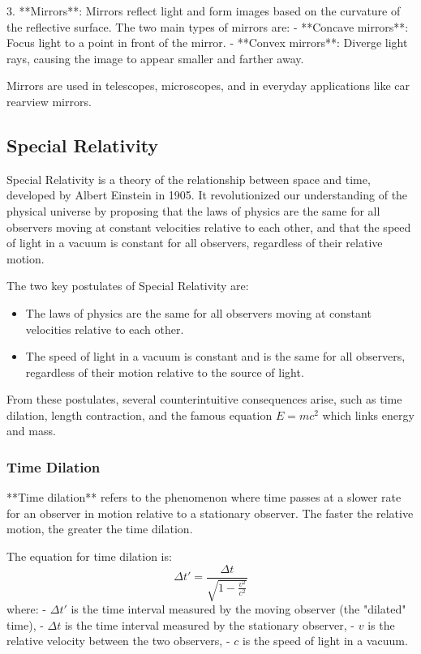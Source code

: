 \documentclass{article}
\begin{document}
3. **Mirrors**: Mirrors reflect light and form images based on the curvature of the reflective surface. The two main types of mirrors are:
   - **Concave mirrors**: Focus light to a point in front of the mirror.
   - **Convex mirrors**: Diverge light rays, causing the image to appear smaller and farther away.

   Mirrors are used in telescopes, microscopes, and in everyday applications like car rearview mirrors.


\subsection{Special Relativity}

Special Relativity is a theory of the relationship between space and time, developed by Albert Einstein in 1905. It revolutionized our understanding of the physical universe by proposing that the laws of physics are the same for all observers moving at constant velocities relative to each other, and that the speed of light in a vacuum is constant for all observers, regardless of their relative motion.

The two key postulates of Special Relativity are:
\begin{itemize}
    \item The laws of physics are the same for all observers moving at constant velocities relative to each other.
    \item The speed of light in a vacuum is constant and is the same for all observers, regardless of their motion relative to the source of light.
\end{itemize}

From these postulates, several counterintuitive consequences arise, such as time dilation, length contraction, and the famous equation \( E = mc^2 \) which links energy and mass.

\subsubsection*{Time Dilation}

**Time dilation** refers to the phenomenon where time passes at a slower rate for an observer in motion relative to a stationary observer. The faster the relative motion, the greater the time dilation.

The equation for time dilation is:
\[
\Delta t' = \frac{\Delta t}{\sqrt{1 - \frac{v^2}{c^2}}}
\]
where:
- \( \Delta t' \) is the time interval measured by the moving observer (the "dilated" time),
- \( \Delta t \) is the time interval measured by the stationary observer,
- \( v \) is the relative velocity between the two observers,
- \( c \) is the speed of light in a vacuum.
\end{document}
